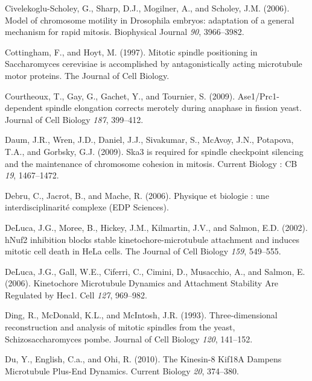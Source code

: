 \documentclass[12pt,a4paper,twoside,openright]{book}
\begin{document}
Civelekoglu-Scholey, G., Sharp, D.J., Mogilner, A., and Scholey, J.M.
(2006). Model of chromosome motility in Drosophila embryos: adaptation
of a general mechanism for rapid mitosis. Biophysical Journal \emph{90},
3966--3982.

Cottingham, F., and Hoyt, M. (1997). Mitotic spindle positioning in
Saccharomyces cerevisiae is accomplished by antagonistically acting
microtubule motor proteins. The Journal of Cell Biology.

Courtheoux, T., Gay, G., Gachet, Y., and Tournier, S. (2009).
Ase1/Prc1-dependent spindle elongation corrects merotely during anaphase
in fission yeast. Journal of Cell Biology \emph{187}, 399--412.

Daum, J.R., Wren, J.D., Daniel, J.J., Sivakumar, S., McAvoy, J.N.,
Potapova, T.A., and Gorbsky, G.J. (2009). Ska3 is required for spindle
checkpoint silencing and the maintenance of chromosome cohesion in
mitosis. Current Biology : CB \emph{19}, 1467--1472.

Debru, C., Jacrot, B., and Mache, R. (2006). Physique et biologie : une
interdisciplinarité complexe (EDP Sciences).

DeLuca, J.G., Moree, B., Hickey, J.M., Kilmartin, J.V., and Salmon, E.D.
(2002). hNuf2 inhibition blocks stable kinetochore-microtubule
attachment and induces mitotic cell death in HeLa cells. The Journal of
Cell Biology \emph{159}, 549--555.

DeLuca, J.G., Gall, W.E., Ciferri, C., Cimini, D., Musacchio, A., and
Salmon, E. (2006). Kinetochore Microtubule Dynamics and Attachment
Stability Are Regulated by Hec1. Cell \emph{127}, 969--982.

Ding, R., McDonald, K.L., and McIntosh, J.R. (1993). Three-dimensional
reconstruction and analysis of mitotic spindles from the yeast,
Schizosaccharomyces pombe. Journal of Cell Biology \emph{120}, 141--152.

Du, Y., English, C.a., and Ohi, R. (2010). The Kinesin-8 Kif18A Dampens
Microtubule Plus-End Dynamics. Current Biology \emph{20}, 374--380.
\end{document}
